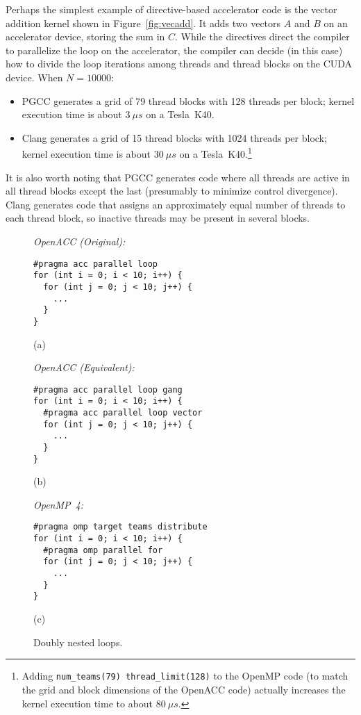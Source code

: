 \documentclass{sig-alternate-05-2015}
\newcommand{\squish}{
     { \setlength{\itemsep}{0pt}      \setlength{\parsep}{3pt}
       \setlength{\topsep}{3pt}       \setlength{\partopsep}{0pt}
       \setlength{\leftmargin}{1.5em} \setlength{\labelwidth}{1em}
       \setlength{\labelsep}{0.5em} } }
\begin{document}
Perhaps the simplest example of directive-based accelerator code is the vector
addition kernel shown in Figure~\ref{fig:vecadd}.  It adds two vectors $A$ and
$B$ on an accelerator device, storing the sum in $C$.  While the directives
direct the compiler to parallelize the loop on the accelerator, the compiler
can decide (in this case) how to divide the loop iterations among threads
and thread blocks on the CUDA device.  When $N = 10000$:
\begin{itemize}\squish
\item PGCC generates a grid of 79 thread blocks with 128 threads per block;
kernel execution time is about $3~\mu s$ on a Tesla~K40.
\item Clang generates a grid of 15 thread blocks with 1024 threads per block;
kernel execution time is about $30~\mu s$ on a Tesla~K40.\footnote{Adding
\texttt{num\_teams(79) thread\_limit(128)} to the OpenMP code (to match the
grid and block dimensions of the OpenACC code) actually increases the kernel
execution time to about $80~\mu s$.
}
\end{itemize}

It is also worth noting that PGCC generates code where all threads are active
in all thread blocks except the last (presumably to minimize control
divergence).  Clang generates code that assigns an approximately equal number
of threads to each thread block, so inactive threads may be present in
several blocks.

\begin{figure*}
\begin{minipage}{.33\textwidth}
\emph{OpenACC (Original):}
{\footnotesize
\begin{verbatim}
#pragma acc parallel loop
for (int i = 0; i < 10; i++) {
  for (int j = 0; j < 10; j++) {
    ...
  }
}

\end{verbatim}
}
\centerline{(a)}
\end{minipage}
\begin{minipage}{.33\textwidth}
\emph{OpenACC (Equivalent):}
{\footnotesize
\begin{verbatim}
#pragma acc parallel loop gang
for (int i = 0; i < 10; i++) {
  #pragma acc parallel loop vector
  for (int j = 0; j < 10; j++) {
    ...
  }
}
\end{verbatim}
}
\centerline{(b)}
\end{minipage}
\begin{minipage}{.33\textwidth}
\emph{OpenMP~4:}
{\footnotesize
\begin{verbatim}
#pragma omp target teams distribute
for (int i = 0; i < 10; i++) {
  #pragma omp parallel for
  for (int j = 0; j < 10; j++) {
    ...
  }
}
\end{verbatim}
}
\centerline{(c)}
\end{minipage}
\caption{Doubly nested loops.}
\label{fig:nest}
\end{figure*}
\end{document}

